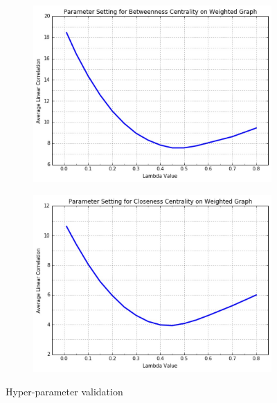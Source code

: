 \documentclass[9pt]{beamer}
\begin{document}
\begin{frame}
\begin{figure}[H]

\vspace{-0.1in}

\centering
\begin{subfigure}{.4\textwidth}
  \centering
  \includegraphics[width=0.95\linewidth]{BCW_2.jpeg}
\end{subfigure}
\begin{subfigure}{.4\textwidth}
	\centering
    \includegraphics[width=0.95\linewidth]{CCW_2.jpeg}
\end{subfigure}
\caption{Hyper-parameter validation}
\end{figure}
\end{frame}
\end{document}
